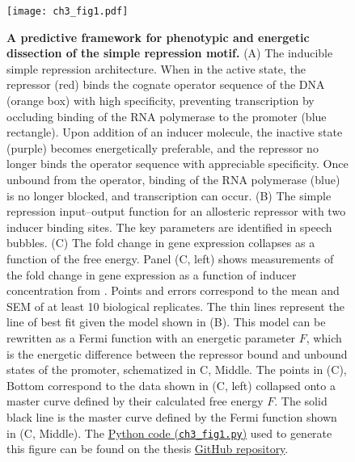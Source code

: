 \documentclass[12pt]{caltech_thesis}
\begin{document}
\hypertarget{fig:mut_induction_summary}{%
\begin{figure}
\centering
\texttt{[image: ch3\_fig1.pdf]}
\caption[{Summary of Chapter 2. A predictive framework for dissection of
the simple repression motif}]{\textbf{A predictive framework for
phenotypic and energetic dissection of the simple repression motif.} (A)
The inducible simple repression architecture. When in the active state,
the repressor (red) binds the cognate operator sequence of the DNA
(orange box) with high specificity, preventing transcription by
occluding binding of the RNA polymerase to the promoter (blue
rectangle). Upon addition of an inducer molecule, the inactive state
(purple) becomes energetically preferable, and the repressor no longer
binds the operator sequence with appreciable specificity. Once unbound
from the operator, binding of the RNA polymerase (blue) is no longer
blocked, and transcription can occur. (B) The simple repression
input--output function for an allosteric repressor with two inducer
binding sites. The key parameters are identified in speech bubbles. (C)
The fold change in gene expression collapses as a function of the free
energy. Panel (C, left) shows measurements of the fold change in gene
expression as a function of inducer concentration from
\textcite{razo-mejia2018}. Points and errors correspond to the mean and
SEM of at least 10 biological replicates. The thin lines represent the
line of best fit given the model shown in (B). This model can be
rewritten as a Fermi function with an energetic parameter \(F\), which
is the energetic difference between the repressor bound and unbound
states of the promoter, schematized in C, Middle. The points in (C),
Bottom correspond to the data shown in (C, left) collapsed onto a master
curve defined by their calculated free energy \(F\). The solid black
line is the master curve defined by the Fermi function shown in (C,
Middle). The
\href{https://github.com/gchure/phd/blob/master/src/chapter_03/code/ch3_fig1.py}{Python
code (\texttt{ch3\_fig1.py})} used to generate this figure can be found
on the thesis \href{https://github.com/gchure/phd}{GitHub repository}.}
\label{fig:mut_induction_summary}
\end{figure}
}
\end{document}
